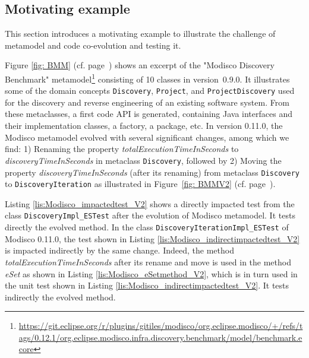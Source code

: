 


	
	\subsection{Motivating example}
	This section introduces a motivating example to illustrate the challenge of metamodel and code co-evolution and testing it. 
	
	Figure \ref{fig: BMM} (cf. page~\pageref{fig: BMM}) shows an excerpt of the "Modisco Discovery Benchmark" metamodel\footnote{\url{https://git.eclipse.org/r/plugins/gitiles/modisco/org.eclipse.modisco/+/refs/tags/0.12.1/org.eclipse.modisco.infra.discovery.benchmark/model/benchmark.ecore}} consisting of 10 classes in version~0.9.0.
	It illustrates some of the domain concepts \texttt{Discovery}, \texttt{Project}, and \texttt{ProjectDiscovery}  used for the discovery and reverse engineering of an existing software system. 
	From these metaclasses, a first code API is generated, containing Java interfaces and their implementation classes, a factory, a package, etc. In version 0.11.0, the Modisco  metamodel evolved with several significant changes, among which we find: 1) Renaming the property \emph{totalExecutionTimeInSeconds} to
	\emph{discoveryTimeInSeconds} in metaclass \texttt{Discovery}, followed by 2) Moving the property \emph{discoveryTimeInSeconds} (after its renaming) from metaclass \texttt{Discovery} to \texttt{DiscoveryIteration} as illustrated in Figure~\ref{fig: BMMV2} (cf. page~\pageref{fig: BMMV2}).
	
	Listing \ref{lis:Modisco_impactedtest_V2} shows a directly impacted test from the class \texttt{DiscoveryImpl\_ESTest} after the evolution of Modisco metamodel. It tests directly the evolved method. 
	In the class \texttt{DiscoveryIterationImpl\_ESTest} of Modisco 0.11.0, the test shown in Listing \ref{lis:Modisco_indirectimpactedtest_V2} is impacted indirectly by the same change. Indeed, the method \emph{totalExecutionTimeInSeconds} after its rename and move is used in the method \emph{eSet} as shown in Listing \ref{lis:Modisco_eSetmethod_V2}, which is in turn used in the unit test shown in Listing \ref{lis:Modisco_indirectimpactedtest_V2}. It tests indirectly the evolved method. 
	
